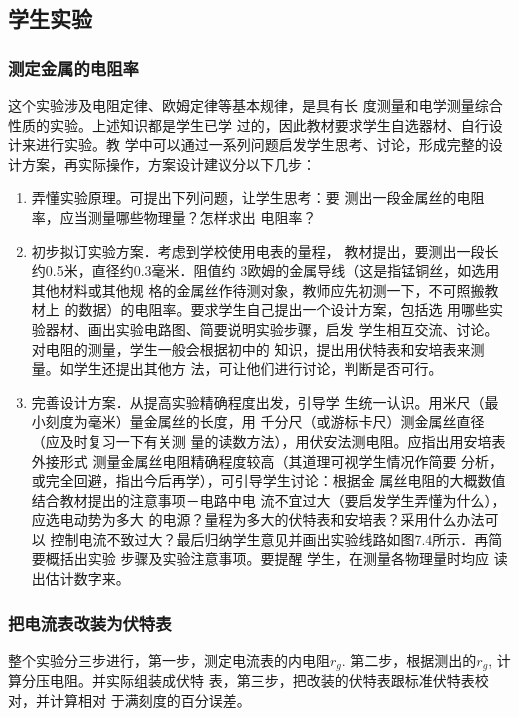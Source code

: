 \subsection{学生实验}
\subsubsection{测定金属的电阻率}
这个实验涉及电阻定律、欧姆定律等基本规律，是具有长
度测量和电学测量综合性质的实验。上述知识都是学生已学
过的，因此教材要求学生自选器材、自行设计来进行实验。教
学中可以通过一系列问题启发学生思考、讨论，形成完整的设
计方案，再实际操作，方案设计建议分以下几步：
\begin{enumerate}
\item 弄懂实验原理。可提出下列问题，让学生思考：要
测出一段金属丝的电阻率，应当测量哪些物理量？怎样求出
电阻率？

\item 初步拟订实验方案．考虑到学校使用电表的量程，
教材提出，要测出一段长约0.5米，直径约0.3毫米．阻值约
3欧姆的金属导线（这是指锰铜丝，如选用其他材料或其他规
格的金属丝作待测对象，教师应先初测一下，不可照搬教材上
的数据）的电阻率。要求学生自己提出一个设计方案，包括选
用哪些实验器材、画出实验电路图、简要说明实验步骤，启发
学生相互交流、讨论。对电阻的测量，学生一般会根据初中的
知识，提出用伏特表和安培表来测量。如学生还提出其他方
法，可让他们进行讨论，判断是否可行。

\item 完善设计方案．从提高实验精确程度出发，引导学
生统一认识。用米尺（最小刻度为毫米）量金属丝的长度，用
千分尺（或游标卡尺）测金属丝直径（应及时复习一下有关测
量的读数方法），用伏安法测电阻。应指出用安培表外接形式
测量金属丝电阻精确程度较高（其道理可视学生情况作简要
分析，或完全回避，指出今后再学），可引导学生讨论：根据金
属丝电阻的大概数值结合教材提出的注意事项－电路中电
流不宜过大（要启发学生弄懂为什么），应选电动势为多大
的电源？量程为多大的伏特表和安培表？采用什么办法可以
控制电流不致过大？最后归纳学生意见并画出实验线路如图7.4所示．再简要概括出实验
步骤及实验注意事项。要提醒
学生，在测量各物理量时均应
读出估计数字来。
\end{enumerate}

\begin{figure}[htp]
    \centering
    \caption{}
\end{figure}

\subsubsection{把电流表改装为伏特表}
整个实验分三步进行，第一步，测定电流表的内电阻$r_g$.
第二步，根据测出的$r_g$, 计算分压电阻。并实际组装成伏特
表，第三步，把改装的伏特表跟标准伏特表校对，并计算相对
于满刻度的百分误差。

